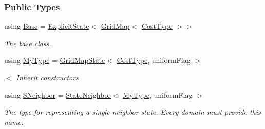 \subsubsection*{Public Types}
\begin{DoxyCompactItemize}
\item 
using \hyperlink{structslb_1_1ext_1_1domain_1_1gridMap_1_1GridMapState_a70393cbe18e1e7c43769aead48994fde}{Base} = \hyperlink{structslb_1_1core_1_1sb_1_1ExplicitState}{Explicit\+State}$<$ \hyperlink{structslb_1_1core_1_1sb_1_1GridMap}{Grid\+Map}$<$ \hyperlink{structslb_1_1core_1_1sb_1_1ExplicitState_ae36e0763ad9b7ee7407aa316d4c64f14}{Cost\+Type} $>$$>$\hypertarget{structslb_1_1ext_1_1domain_1_1gridMap_1_1GridMapState_a70393cbe18e1e7c43769aead48994fde}{}\label{structslb_1_1ext_1_1domain_1_1gridMap_1_1GridMapState_a70393cbe18e1e7c43769aead48994fde}

\begin{DoxyCompactList}\small\item\em The base class. \end{DoxyCompactList}\item 
using \hyperlink{structslb_1_1ext_1_1domain_1_1gridMap_1_1GridMapState_a5670f2d1eab2ffb4953cd947e159d78a}{My\+Type} = \hyperlink{structslb_1_1ext_1_1domain_1_1gridMap_1_1GridMapState}{Grid\+Map\+State}$<$ \hyperlink{structslb_1_1core_1_1sb_1_1ExplicitState_ae36e0763ad9b7ee7407aa316d4c64f14}{Cost\+Type}, uniform\+Flag $>$
\begin{DoxyCompactList}\small\item\em $<$ Inherit constructors \end{DoxyCompactList}\item 
using \hyperlink{structslb_1_1ext_1_1domain_1_1gridMap_1_1GridMapState_af34ea6314b8473d2a81ebd1feec1df1d}{S\+Neighbor} = \hyperlink{structslb_1_1core_1_1sb_1_1StateNeighbor}{State\+Neighbor}$<$ \hyperlink{structslb_1_1ext_1_1domain_1_1gridMap_1_1GridMapState_a5670f2d1eab2ffb4953cd947e159d78a}{My\+Type}, uniform\+Flag $>$\hypertarget{structslb_1_1ext_1_1domain_1_1gridMap_1_1GridMapState_af34ea6314b8473d2a81ebd1feec1df1d}{}\label{structslb_1_1ext_1_1domain_1_1gridMap_1_1GridMapState_af34ea6314b8473d2a81ebd1feec1df1d}

\begin{DoxyCompactList}\small\item\em The type for representing a single neighbor state. Every domain must provide this name. \end{DoxyCompactList}\end{DoxyCompactItemize}
